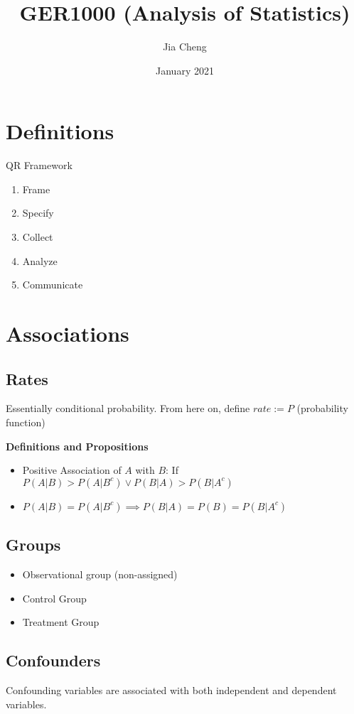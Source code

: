 \documentclass{article}
\title{GER1000 (Analysis of Statistics)}
\author{Jia Cheng}
\date{January 2021}
\begin{document}
\maketitle

\section{Definitions}
QR Framework
\begin{enumerate}
	\item Frame 
	\item Specify 
	\item Collect 
	\item Analyze 
	\item Communicate
\end{enumerate}

\section{Associations}
\subsection{Rates}
Essentially conditional probability.
From here on, define $rate:=P$ (probability function)

\textbf{Definitions and Propositions
}\begin{itemize}
	\item Positive Association of $A$ with $B$: If $P(A|B) > P(A|B^c) \lor P(B|A) > P(B|A^c)$
	\item $P(A|B) = P(A|B^c) \implies P(B|A) = P(B) = P(B|A^c)$
\end{itemize}

\subsection{Groups}
\begin{itemize}
	\item Observational group (non-assigned)
	\item Control Group
	\item Treatment Group
\end{itemize}

\subsection{Confounders}
Confounding variables are associated with both independent and dependent variables.
\end{document}
